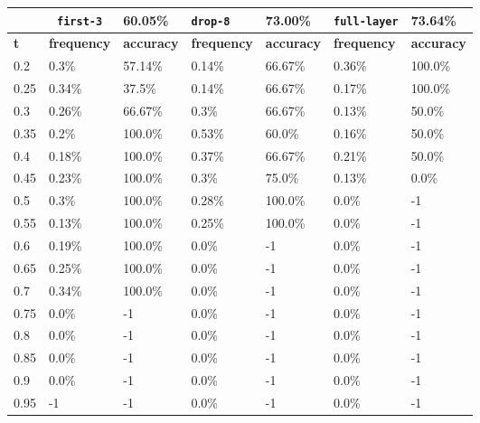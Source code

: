 
\begin{table}[t]
\centering
\begin{tabular}{lllllll} %
\hline

\multicolumn{1}{c}{}& 
\multicolumn{1}{c}{\texttt{first-3}} & \multicolumn{1}{l|}{60.05\%} 
& \multicolumn{1}{l}{\texttt{drop-8}} & \multicolumn{1}{l|}{73.00\%}
& \multicolumn{1}{l}{\texttt{full-layer}} & 73.64\%
\\ \hline
\multicolumn{1}{l|}{\textbf{t}} &
\multicolumn{1}{l|}{\textbf{frequency}} & 
\multicolumn{1}{l|}{\textbf{accuracy}} & 
\multicolumn{1}{l|}{\textbf{frequency}} & 
\multicolumn{1}{l|}{\textbf{accuracy}} & 
\multicolumn{1}{l|}{\textbf{frequency}} & 
\multicolumn{1}{l|}{\textbf{accuracy}} \\ \hline
	\multicolumn{1}{l|}{0.2}&  0.3\% & \multicolumn{1}{l|}{57.14\%}& 0.14\% & \multicolumn{1}{l|}{66.67\%}& 0.36\% & 100.0\%\\ 
\multicolumn{1}{l|}{0.25}&  0.34\% & \multicolumn{1}{l|}{37.5\%}& 0.14\% & \multicolumn{1}{l|}{66.67\%}& 0.17\% & 100.0\%\\ 
\multicolumn{1}{l|}{0.3}&  0.26\% & \multicolumn{1}{l|}{66.67\%}& 0.3\% & \multicolumn{1}{l|}{66.67\%}& 0.13\% & 50.0\%\\ 
\multicolumn{1}{l|}{0.35}&  0.2\% & \multicolumn{1}{l|}{100.0\%}& 0.53\% & \multicolumn{1}{l|}{60.0\%}& 0.16\% & 50.0\%\\ 
\multicolumn{1}{l|}{0.4}&  0.18\% & \multicolumn{1}{l|}{100.0\%}& 0.37\% & \multicolumn{1}{l|}{66.67\%}& 0.21\% & 50.0\%\\ 
\multicolumn{1}{l|}{0.45}&  0.23\% & \multicolumn{1}{l|}{100.0\%}& 0.3\% & \multicolumn{1}{l|}{75.0\%}& 0.13\% & 0.0\%\\ 
\multicolumn{1}{l|}{0.5}&  0.3\% & \multicolumn{1}{l|}{100.0\%}& 0.28\% & \multicolumn{1}{l|}{100.0\%}& 0.0\% & -1\\ 
\multicolumn{1}{l|}{0.55}&  0.13\% & \multicolumn{1}{l|}{100.0\%}& 0.25\% & \multicolumn{1}{l|}{100.0\%}& 0.0\% & -1\\ 
\multicolumn{1}{l|}{0.6}&  0.19\% & \multicolumn{1}{l|}{100.0\%}& 0.0\% & \multicolumn{1}{l|}{-1}& 0.0\% & -1\\ 
\multicolumn{1}{l|}{0.65}&  0.25\% & \multicolumn{1}{l|}{100.0\%}& 0.0\% & \multicolumn{1}{l|}{-1}& 0.0\% & -1\\ 
\multicolumn{1}{l|}{0.7}&  0.34\% & \multicolumn{1}{l|}{100.0\%}& 0.0\% & \multicolumn{1}{l|}{-1}& 0.0\% & -1\\ 
\multicolumn{1}{l|}{0.75}&  0.0\% & \multicolumn{1}{l|}{-1}& 0.0\% & \multicolumn{1}{l|}{-1}& 0.0\% & -1\\ 
\multicolumn{1}{l|}{0.8}&  0.0\% & \multicolumn{1}{l|}{-1}& 0.0\% & \multicolumn{1}{l|}{-1}& 0.0\% & -1\\ 
\multicolumn{1}{l|}{0.85}&  0.0\% & \multicolumn{1}{l|}{-1}& 0.0\% & \multicolumn{1}{l|}{-1}& 0.0\% & -1\\ 
\multicolumn{1}{l|}{0.9}&  0.0\% & \multicolumn{1}{l|}{-1}& 0.0\% & \multicolumn{1}{l|}{-1}& 0.0\% & -1\\ 
\multicolumn{1}{l|}{0.95}&  -1 & \multicolumn{1}{l|}{-1}& 0.0\% & \multicolumn{1}{l|}{-1}& 0.0\% & -1\\ 


\end{tabular}
\end{table}
